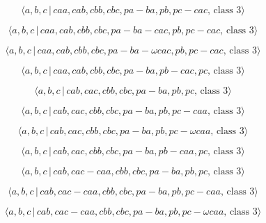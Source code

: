\documentclass[10pt]{article}
\begin{document}
\begin{equation}
\langle a,b,c\,|\,caa,cab,cbb,cbc,pa-ba,pb,pc-cac,\,\text{class }3\rangle 
\tag{7.1288}
\end{equation}

\begin{equation}
\langle a,b,c\,|\,caa,cab,cbb,cbc,pa-ba-cac,pb,pc-cac,\,\text{class }3\rangle
\tag{7.1289}
\end{equation}

\begin{equation}
\langle a,b,c\,|\,caa,cab,cbb,cbc,pa-ba-\omega cac,pb,pc-cac,\,\text{class }%
3\rangle  \tag{7.1290}
\end{equation}

\begin{equation}
\langle a,b,c\,|\,caa,cab,cbb,cbc,pa-ba,pb-cac,pc,\,\text{class }3\rangle 
\tag{7.1291}
\end{equation}

\begin{equation}
\langle a,b,c\,|\,cab,cac,cbb,cbc,pa-ba,pb,pc,\,\text{class }3\rangle 
\tag{7.1292}
\end{equation}

\begin{equation}
\langle a,b,c\,|\,cab,cac,cbb,cbc,pa-ba,pb,pc-caa,\,\text{class }3\rangle 
\tag{7.1293}
\end{equation}

\begin{equation}
\langle a,b,c\,|\,cab,cac,cbb,cbc,pa-ba,pb,pc-\omega caa,\,\text{class }%
3\rangle  \tag{7.1294}
\end{equation}

\begin{equation}
\langle a,b,c\,|\,cab,cac,cbb,cbc,pa-ba,pb-caa,pc,\,\text{class }3\rangle 
\tag{7.1295}
\end{equation}

\begin{equation}
\langle a,b,c\,|\,cab,cac-caa,cbb,cbc,pa-ba,pb,pc,\,\text{class }3\rangle 
\tag{7.1296}
\end{equation}

\begin{equation}
\langle a,b,c\,|\,cab,cac-caa,cbb,cbc,pa-ba,pb,pc-caa,\,\text{class }3\rangle
\tag{7.1297}
\end{equation}

\begin{equation}
\langle a,b,c\,|\,cab,cac-caa,cbb,cbc,pa-ba,pb,pc-\omega caa,\,\text{class }%
3\rangle  \tag{7.1298}
\end{equation}
\end{document}

